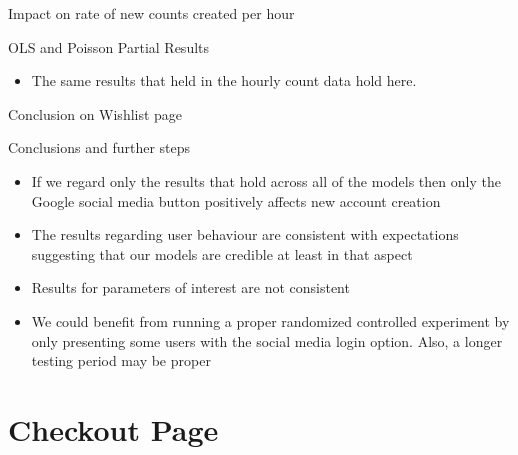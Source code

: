 \documentclass{beamer}
\begin{document}
			\begin{frame}{Impact on rate of new counts created per hour}
				\begin{block}{OLS and Poisson Partial Results}
					\begin{itemize}
						\item The same results that held in the hourly count data hold here. 
					\end{itemize}
				\end{block}
			\end{frame}
			
			\begin{frame}{Conclusion on Wishlist page}
				\begin{block}{Conclusions and further steps}
					\begin{itemize}
						\item If we regard only the results that hold across all of the models then only the Google social media button positively affects new account creation
						\item The results regarding user behaviour are consistent with expectations suggesting that our models are credible at least in that aspect
						\item Results for parameters of interest are not consistent
						\item We could benefit from running a proper randomized controlled experiment by only presenting some users with the social media login option. Also, a longer testing period may be proper
					\end{itemize}
				\end{block}
			\end{frame}
			
	\section{Checkout Page}
\end{document}
